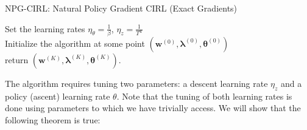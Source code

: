 \begin{algorithm}
    \SetAlgoLined
  \small
    \caption{NPG-CIRL: Natural Policy Gradient CIRL (Exact Gradients)} 
    \label{alg:npg-cirl}
      Set the learning rates $\eta_\theta = \frac{1}{\beta}$, $\eta_z = \frac{1}{T^u}$ \\
      Initialize the algorithm at some point $(\bm{w}^{(0)},\bm{\lambda}^{(0)},\bm{\theta}^{(0)})$  \\
      return $(\bm{w}^{(K)},\bm{\lambda}^{(K)},\bm{\theta}^{(K)})$.
  \end{algorithm}
  The algorithm requires tuning two parameters: a descent learning rate $\eta_z$ and a policy (ascent) learning rate $\theta$. Note that the tuning of both learning rates is done using parameters to which we have trivially access. We will show that the following theorem is true:
